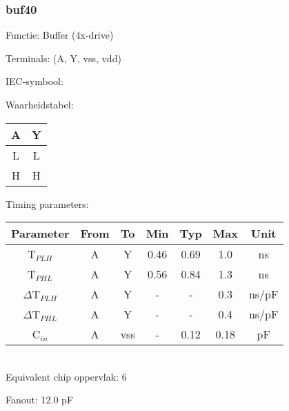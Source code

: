 \subsubsection{buf40}
Functie: Buffer (4x-drive)

Terminals: (A, Y, vss, vdd)


IEC-symbool:
\begin{figure}[bth]
\end{figure}

\begin{minipage}[t]{0.3\textwidth}
Waarheidstabel:\\

\begin{tabular}{|c||c|}
\hline
A	&Y\\
\hline
L	&L\\
H	&H\\
\hline
\end{tabular}
\end{minipage}
\hfill
\begin{minipage}[t]{0.6\textwidth}
Timing parameters:\\

\begin{tabular}{|c|cc|ccc|c|}
\hline
Parameter               &From            &To   	&Min	&Typ	&Max    &Unit\\
\hline
T$_{PLH}$               &A     		&Y      &0.46	&0.69	&1.0    &ns\\
T$_{PHL}$               &A    		&Y      &0.56	&0.84	&1.3    &ns\\
\hline
$\Delta$T$_{PLH}$       &A           	&Y      &-	&-	&0.3    &ns/pF\\
$\Delta$T$_{PHL}$       &A           	&Y      &-	&-	&0.4    &ns/pF\\
\hline
C$_{in}$                &A	    	&vss    &-	&0.12	&0.18   &pF\\
\hline
\end{tabular}
\end{minipage}
\\

Equivalent chip oppervlak: 6

Fanout: 12.0 pF

\clearpage
